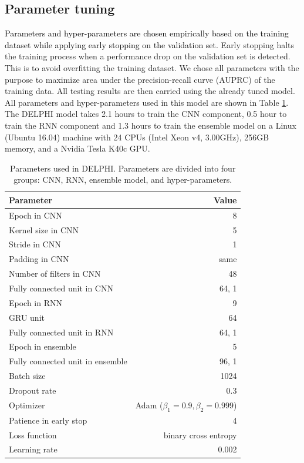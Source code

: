 \documentclass{bioinfo}
\newcommand{\myColor}{black}
\begin{document}
\begin{methods}
\subsection{Parameter tuning}
\textcolor{\myColor}{Parameters and hyper-parameters are chosen empirically based on the training dataset while applying early stopping \citep{prechelt1998early} on the validation set.} Early stopping halts the training process when a performance drop on the validation set is detected. This is to avoid overfitting the training dataset. We chose all parameters with the purpose to maximize area under the precision-recall curve (AUPRC) of the training data. All testing results are then carried using the already tuned model. All parameters and hyper-parameters used in this model are shown in Table \ref{tab_parameter}. 
The DELPHI model takes 2.1 hours to train the CNN component, 0.5 hour to train the RNN component and 1.3 hours to train the ensemble model on a Linux (Ubuntu 16.04) machine with 24 CPUs (Intel Xeon v4, 3.00GHz), 256GB memory, and a Nvidia Tesla K40c GPU.

\begin{table}[H]
  \centering
  \caption{Parameters used in DELPHI. Parameters are divided into four groups: CNN, RNN, ensemble model, and hyper-parameters.}
    \begin{tabular}{@{}p{4.4cm}r@{}}
    \toprule
    Parameter & Value \\
    \midrule
    Epoch in CNN & 8 \\
    Kernel size in CNN & 5 \\
    Stride in CNN & 1 \\
    Padding in CNN & same \\
    Number of filters in CNN & 48 \\
    Fully connected unit in CNN & 64, 1 \\
    \hline
    Epoch in RNN & 9 \\
    GRU unit & 64 \\
    Fully connected unit in RNN & 64, 1 \\
    \hline
    Epoch in ensemble & 5 \\
    Fully connected unit in ensemble & 96, 1 \\
    \hline
    Batch size & 1024 \\
    Dropout rate & 0.3 \\
    Optimizer & Adam ($\beta_1=0.9, \beta_2=0.999$) \\
    Patience in early stop & 4 \\
    Loss function & binary cross entropy \\
    Learning rate & 0.002 \\
    \bottomrule
    \end{tabular}%
  \label{tab_parameter}%
\end{table}%

\end{methods}
\end{document}
